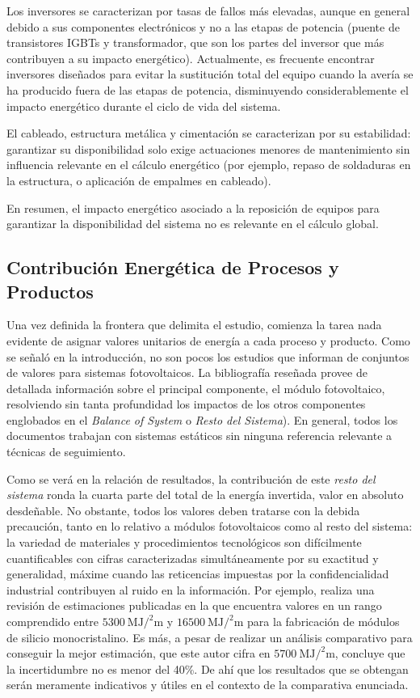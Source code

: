 Los inversores se caracterizan por tasas de fallos más elevadas,
aunque en general debido a sus componentes electrónicos y no a las
etapas de potencia (puente de transistores IGBTs y transformador, que
son los partes del inversor que más contribuyen a su impacto
energético). Actualmente, es frecuente encontrar inversores diseñados
para evitar la sustitución total del equipo cuando la avería se ha
producido fuera de las etapas de potencia, disminuyendo
considerablemente el impacto energético durante el ciclo de vida del
sistema. 

El cableado, estructura metálica y cimentación se caracterizan por su
estabilidad: garantizar su disponibilidad solo exige actuaciones
menores de mantenimiento sin influencia relevante en el cálculo
energético (por ejemplo, repaso de soldaduras en la estructura, o
aplicación de empalmes en cableado). 

En resumen, el impacto energético asociado a la reposición de equipos
para garantizar la disponibilidad del sistema no es relevante en el
cálculo global.

\subsection{Contribución Energética de Procesos y Productos}


Una vez definida la frontera que delimita el estudio, comienza la
tarea nada evidente de asignar valores unitarios de energía a cada
proceso y producto. Como se señaló en la introducción, no son pocos
los estudios que informan de conjuntos de valores para sistemas
fotovoltaicos.  La bibliografía reseñada provee de detallada
información sobre el principal componente, el módulo fotovoltaico,
resolviendo sin tanta profundidad los impactos de los otros
componentes englobados en el \emph{Balance of System} o \emph{Resto
  del Sistema}).  En general, todos los documentos trabajan con
sistemas estáticos sin ninguna referencia relevante a técnicas de
seguimiento.

Como se verá en la relación de resultados, la contribución de este
\emph{resto del sistema} ronda la cuarta parte del total de la energía
invertida, valor en absoluto desdeñable. No obstante, todos los
valores deben tratarse con la debida precaución, tanto en lo relativo
a módulos fotovoltaicos como al resto del sistema: la variedad de
materiales y procedimientos tecnológicos son difícilmente
cuantificables con cifras caracterizadas simultáneamente por su
exactitud y generalidad, máxime cuando las reticencias impuestas por
la confidencialidad industrial contribuyen al ruido en la
información. Por ejemplo, \cite{Alsema2000} realiza una revisión de
estimaciones publicadas en la que encuentra valores en un rango
comprendido entre $\SI{5300}{\mega\joule\per\squared\meter}$ y
$\SI{16500}{\mega\joule\per\squared\meter}$ para la fabricación de
módulos de silicio monocristalino. Es más, a pesar de realizar un
análisis comparativo para conseguir la mejor estimación, que este
autor cifra en $\SI{5700}{\mega\joule\per\squared\meter}$, concluye
que la incertidumbre no es menor del 40\%. De ahí que los resultados
que se obtengan serán meramente indicativos y útiles en el contexto de
la comparativa enunciada.

